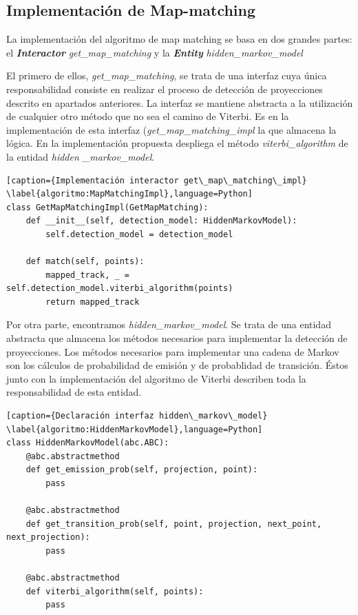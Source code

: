 \subsection{Implementación de Map-matching}
La implementación del algoritmo de map matching se basa en dos grandes partes: 
el \textbf{\textit{Interactor}} \textit{get\_map\_matching} y la \textbf{\textit{Entity}} 
\textit{hidden\_markov\_model}

El primero de ellos, \textit{get\_map\_matching}, se trata de una interfaz cuya única 
responsabilidad consiste en realizar el proceso de detección de proyecciones descrito 
en apartados anteriores. La interfaz se mantiene abstracta a la utilización de cualquier 
otro método que no sea el camino de Viterbi. Es en la implementación de esta interfaz 
(\textit{get\_map\_matching\_impl} la que almacena la lógica. En la implementación 
propuesta despliega el método \textit{viterbi\_algorithm} de la entidad \textit{hidden
\_markov\_model}.

\begin{lstlisting}[caption={Implementación interactor get\_map\_matching\_impl}
\label{algoritmo:MapMatchingImpl},language=Python] 
class GetMapMatchingImpl(GetMapMatching):
    def __init__(self, detection_model: HiddenMarkovModel):
        self.detection_model = detection_model

    def match(self, points):
        mapped_track, _ = self.detection_model.viterbi_algorithm(points)
        return mapped_track
\end{lstlisting}

Por otra parte, encontramos \textit{hidden\_markov\_model}. Se trata de una entidad 
abstracta que almacena los métodos necesarios para implementar la detección de 
proyecciones. Los métodos necesarios para implementar una cadena de Markov son 
los cálculos de probabilidad de emisión y de probablidad de transición. Éstos junto con 
la implementación del algoritmo de Viterbi describen toda la responsabilidad de esta 
entidad.

\begin{lstlisting}[caption={Declaración interfaz hidden\_markov\_model}
\label{algoritmo:HiddenMarkovModel},language=Python] 
class HiddenMarkovModel(abc.ABC):
    @abc.abstractmethod
    def get_emission_prob(self, projection, point):
        pass

    @abc.abstractmethod
    def get_transition_prob(self, point, projection, next_point, next_projection):
        pass

    @abc.abstractmethod
    def viterbi_algorithm(self, points):
        pass
\end{lstlisting}

